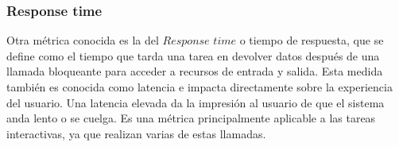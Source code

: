 % 
% 
% 
% 
%   
% 


\subsubsection{Response time}

Otra métrica conocida es la del $Response$ $time$ o tiempo de respuesta, que se define como el tiempo que tarda una tarea en devolver datos después de una llamada bloqueante para acceder a recursos de entrada y salida. Esta medida también es conocida como latencia e impacta directamente sobre la experiencia del usuario. Una latencia elevada da la impresión al usuario de que el sistema anda lento o se cuelga. Es una métrica principalmente aplicable a las tareas interactivas, ya que realizan varias de estas llamadas.

